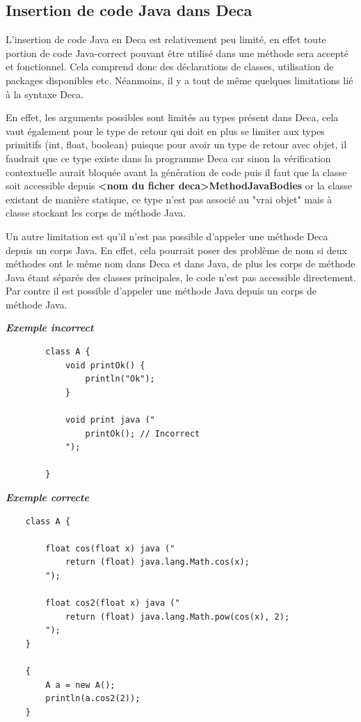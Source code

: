 \documentclass[12pt, a4paper, one side]{article}
\begin{document}
    \subsection{Insertion de code Java dans Deca}
    L'insertion de code Java en Deca est relativement peu limité, en effet toute portion de code Java-correct pouvant être utilisé dans une méthode sera accepté et fonctionnel. Cela comprend donc des déclarations de classes, utilisation de packages disponibles etc. Néanmoins, il y a tout de même quelques limitations lié à la syntaxe Deca.

    En effet, les arguments possibles sont limités au types présent dans Deca, cela vaut également pour le type de retour qui doit en plus se limiter aux types primitifs (int, float, boolean) puisque pour avoir un type de retour avec objet, il faudrait que ce type existe dans la programme Deca car sinon la vérification contextuelle aurait bloquée avant la génération de code puis il faut que la classe soit accessible depuis \textbf{<nom du ficher deca>MethodJavaBodies} or la classe existant de manière statique, ce type n'est pas associé au "vrai objet" mais à classe stockant les corps de méthode Java.

    Un autre limitation est qu'il n'est pas possible d'appeler une méthode Deca depuis un corps Java. En effet, cela pourrait poser des problème de nom si deux méthodes ont le même nom dans Deca et dans Java, de plus les corps de méthode Java étant séparés des classes principales, le code n'est pas accessible directement. Par contre il est possible d'appeler une méthode Java depuis un corps de méthode Java.

    \textbf{\textit{Exemple incorrect}}
    \begin{verbatim}
        class A {
            void printOk() {
                println("Ok");
            }

            void print java ("
                printOk(); // Incorrect
            ");

        }
    \end{verbatim}

    \textbf{\textit{Exemple correcte}}
    \begin{verbatim}
    class A {

        float cos(float x) java ("
            return (float) java.lang.Math.cos(x);
        ");

        float cos2(float x) java ("
            return (float) java.lang.Math.pow(cos(x), 2);
        ");
    }

    {
        A a = new A();
        println(a.cos2(2));
    }
    \end{verbatim}
\end{document}
